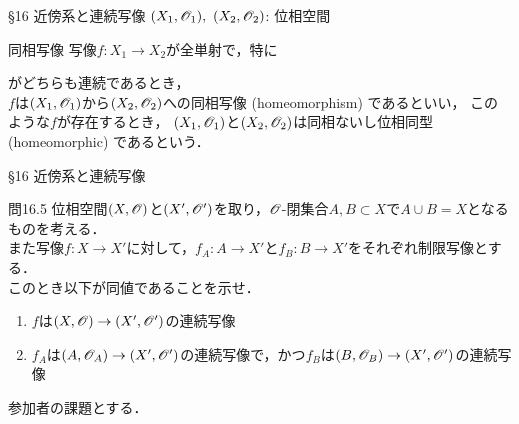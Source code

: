 \documentclass[uplatex,a4paper,dvipdfmx,aspectratio=169,11pt]{beamer}
\begin{document}
\begin{frame}[fragile]{\S 16 近傍系と連続写像}
    $(X_1, \mathscr{O}_1),\ (X_2, \mathscr{O}_2)$: 位相空間
    \begin{block}{同相写像}
        写像$f \colon X_1 \to X_2$が全単射で，特にがどちらも連続であるとき，\\
        $f$は$(X_1, \mathscr{O}_1)$から$(X_2, \mathscr{O}_2)$への\alert{同相写像} (homeomorphism) であるといい，
        このような$f$が存在するとき，
        $(X_1, \mathscr{O}_1)$と$(X_2, \mathscr{O}_2)$は\alert{同相}ないし\alert{位相同型} (homeomorphic) であるという．
    \end{block}
\end{frame}

\begin{frame}[fragile]{\S 16 近傍系と連続写像}
    \begin{exampleblock}{問16.5}
        位相空間$(X, \mathscr{O})$と$(X', \mathscr{O}')$を取り，$\mathscr{O}$-閉集合$A, B \subset X$で$A \cup B = X$となるものを考える．\\
        また写像$f\colon X \to X'$に対して，$f_A \colon A \to X'$と$f_B \colon B \to X'$をそれぞれ制限写像とする．\\
        このとき以下が同値であることを示せ．
        \begin{enumerate}
            \item $f$は$(X, \mathscr{O}) \to (X', \mathscr{O}')$の連続写像
            \item $f_A$は$(A, \mathscr{O}_A) \to (X', \mathscr{O}')$の連続写像で，かつ$f_B$は$(B, \mathscr{O}_B) \to (X', \mathscr{O}')$の連続写像
        \end{enumerate}
    \end{exampleblock}

    \medskip{}

     \quad 参加者の課題とする．
\end{frame}
\end{document}
